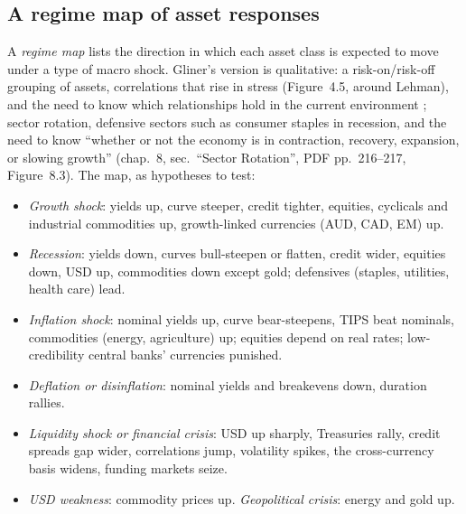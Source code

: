\subsection{A regime map of asset responses}

\begin{qfdefinition}\label{def:macro-regime-asset-map}
 A \emph{regime map} lists the direction in which each asset class is expected to move under a type of macro shock. Gliner's version is qualitative: a risk-on/risk-off grouping of assets, correlations that rise in stress (Figure~4.5, around Lehman), and the need to know which relationships hold in the current environment \citep[chap.~4, sec.\ ``Assessing the Relationships between Assets'', PDF pp.~98--102]{s7-gliner}; sector rotation, defensive sectors such as consumer staples in recession, and the need to know ``whether or not the economy is in contraction, recovery, expansion, or slowing growth'' (chap.~8, sec.\ ``Sector Rotation'', PDF pp.~216--217, Figure~8.3). The map, as hypotheses to test:
\begin{itemize}
\item \emph{Growth shock}: yields up, curve steeper, credit tighter, equities, cyclicals and industrial commodities up, growth-linked currencies (AUD, CAD, EM) up.
\item \emph{Recession}: yields down, curves bull-steepen or flatten, credit wider, equities down, USD up, commodities down except gold; defensives (staples, utilities, health care) lead.
\item \emph{Inflation shock}: nominal yields up, curve bear-steepens, TIPS beat nominals, commodities (energy, agriculture) up; equities depend on real rates; low-credibility central banks' currencies punished.
\item \emph{Deflation or disinflation}: nominal yields and breakevens down, duration rallies.
\item \emph{Liquidity shock or financial crisis}: USD up sharply, Treasuries rally, credit spreads gap wider, correlations jump, volatility spikes, the cross-currency basis widens, funding markets seize.
\item \emph{USD weakness}: commodity prices up. \emph{Geopolitical crisis}: energy and gold up.
\end{itemize}

\end{qfdefinition}
